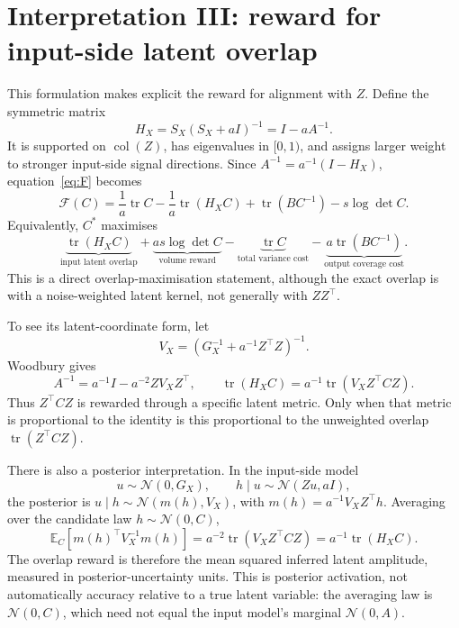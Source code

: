 \documentclass[11pt,a4paper]{article}
\newcommand{\tr}{\operatorname{tr}}
\newcommand{\E}{\mathbb E}
\newcommand{\N}{\mathcal N}
\newcommand{\F}{\mathcal F}
\begin{document}
\section{Interpretation III: reward for input-side latent overlap}
This formulation makes explicit the reward for alignment with $Z$.
Define the symmetric matrix
\begin{equation}
 H_X=S_X(S_X+aI)^{-1}=I-aA^{-1}.
\end{equation}
It is supported on $\operatorname{col}(Z)$, has eigenvalues in $[0,1)$,
and assigns larger weight to stronger input-side signal directions.
Since $A^{-1}=a^{-1}(I-H_X)$, equation~\eqref{eq:F} becomes
\begin{equation}\label{eq:overlap}
 \boxed{\F(C)=\frac1a\tr C-\frac1a\tr(H_XC)
 +\tr(BC^{-1})-s\log\det C.}
\end{equation}
Equivalently, $C^*$ maximises
\begin{equation}
 \underbrace{\tr(H_XC)}_{\text{input latent overlap}}
 +\underbrace{as\log\det C}_{\text{volume reward}}
 -\underbrace{\tr C}_{\text{total variance cost}}
 -\underbrace{a\tr(BC^{-1})}_{\text{output coverage cost}}.
\end{equation}
This is a direct overlap-maximisation statement, although the exact overlap
is with a noise-weighted latent kernel, not generally with $ZZ^\top$.

To see its latent-coordinate form, let
\begin{equation}
 V_X=\left(G_X^{-1}+a^{-1}Z^\top Z\right)^{-1}.
\end{equation}
Woodbury gives
\begin{equation}
 A^{-1}=a^{-1}I-a^{-2}ZV_XZ^\top,
 \qquad \tr(H_XC)=a^{-1}\tr(V_XZ^\top CZ).
\end{equation}
Thus $Z^\top CZ$ is rewarded through a specific latent metric.
Only when that metric is proportional to the identity is this proportional
to the unweighted overlap $\tr(Z^\top CZ)$.

There is also a posterior interpretation. In the input-side model
\begin{equation}
 u\sim\N(0,G_X),\qquad h\mid u\sim\N(Zu,aI),
\end{equation}
the posterior is $u\mid h\sim\N(m(h),V_X)$, with
$m(h)=a^{-1}V_XZ^\top h$. Averaging over the candidate law $h\sim\N(0,C)$,
\begin{equation}
 \E_C[m(h)^\top V_X^{-1}m(h)]
 =a^{-2}\tr(V_XZ^\top CZ)=a^{-1}\tr(H_XC).
\end{equation}
The overlap reward is therefore the mean squared inferred latent amplitude,
measured in posterior-uncertainty units. This is posterior activation,
not automatically accuracy relative to a true latent variable: the averaging
law is $\N(0,C)$, which need not equal the input model's marginal $\N(0,A)$.
\end{document}
